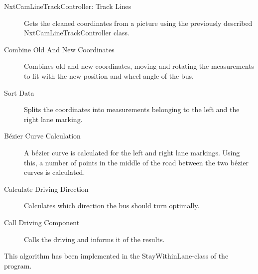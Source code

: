 \begin{description}
    \item[NxtCamLineTrackController: Track Lines]
    Gets the cleaned coordinates from a picture using the previously described NxtCamLineTrackController class. 
    \item[Combine Old And New Coordinates]
    Combines old and new coordinates, moving and rotating the measurements to fit with the new position and wheel angle of the bus. 
    \item[Sort Data]
    Splits the coordinates into measurements belonging to the left and the right lane marking. 
    \item[Bézier Curve Calculation]
    A bézier curve is calculated for the left and right lane markings. Using this, a number of points in the middle of the road between the two bézier curves is calculated.
    \item[Calculate Driving Direction]
    Calculates which direction the bus should turn optimally. 
    \item[Call Driving Component]
    Calls the driving and informs it of the results.
\end{description}

This algorithm has been implemented in the StayWithinLane-class of the program. 
